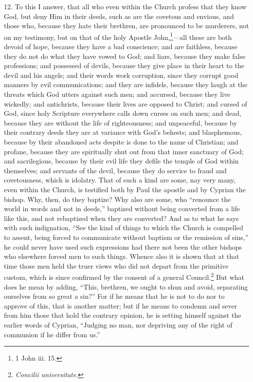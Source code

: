 12. To this I answer, that all who even within the Church profess that they know God, but deny Him in their deeds, such as are the covetous and envious, and those who, because they hate their brethren, are pronounced to be murderers, not on my testimony, but on that of the holy Apostle John,\footnote{\par  1 John iii. 15.}—all these are both devoid of hope, because they have a bad conscience; and are faithless, because they do not do what they have vowed to God; and liars, because they make false professions; and possessed of devils, because they give place in their heart to the devil and his angels; and their words work corruption, since they corrupt good manners by evil communications; and they are infidels, because they laugh at the threats which God utters against such men; and accursed, because they live wickedly; and antichrists, because their lives are opposed to Christ; and cursed of God, since holy Scripture everywhere calls down curses on such men; and dead, because they are without the life of righteousness; and unpeaceful, because by their contrary deeds they are at variance with God’s behests; and blasphemous, because by their abandoned acts despite is done to the name of Christian; and profane, because they are spiritually shut out from that inner sanctuary of God; and sacrilegious, because by their evil life they defile the temple of God within themselves; and servants of the devil, because they do service to fraud and covetousness, which is idolatry. That of such a kind are some, nay very many, even within the Church, is testified both by Paul the apostle and by Cyprian the bishop. Why, then, do they baptize? Why also are some, who ``renounce the world in words and not in deeds,'' baptized without being converted from a life like this, and not rebaptized when they are converted? And as to what he says with such indignation, ``See the kind of things to which the Church is compelled to assent, being forced to communicate without baptism or the remission of sins,'' he could never have used such expressions had there not been the other bishops who elsewhere forced men to such things. Whence also it is shown that at that time those men held the truer views who did not depart from the primitive custom, which is since confirmed by the consent of a general Council.\footnote{\par  \emph{Concilii universitate}.} But what does he mean by adding, ``This, brethren, we ought to shun and avoid, separating ourselves from so great a sin?'' For if he means that he is not to do nor to approve of this, that is another matter; but if he means to condemn and sever from him those that hold the contrary opinion, he is setting himself against the earlier words of Cyprian, ``Judging no man, nor depriving any of the right of communion if he differ from us.''

